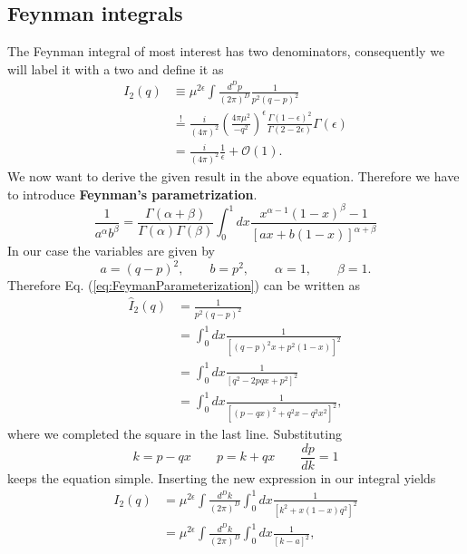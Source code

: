 \subsection*{Feynman integrals}
\label{sec:FeynmanIntegrals}
The Feynman integral of most interest has two denominators, consequently we will label it with a two and define it as
	\begin{equation}
		\label{eq:I2Integral}
		\begin{split}
			I_2(q) &\equiv \mu^{2\epsilon} \int \frac{d^Dp}{(2\pi)^D} \frac{1}{p^2(q-p)^2} \\
			&\overset{!}{=} \frac{i}{(4\pi)^2} \left(\frac{4 \pi \mu^2}{-q^2}\right)^\epsilon \frac{\Gamma(1-\epsilon)^2}{\Gamma(2-2\epsilon)} \Gamma(\epsilon) \\
			&= \frac{i}{(4\pi)^2} \frac{1}{\epsilon} + \mathcal{O}(1).
		\end{split}
	\end{equation}
	We now want to derive the given result in the above equation. Therefore we have to introduce \textbf{Feynman's parametrization}.	
	\begin{equation}
		\label{eq:FeymanParameterization}
		\frac{1}{a^\alpha b^\beta} = \frac{\Gamma(\alpha+\beta)}{\Gamma(\alpha)\Gamma(\beta)} \int_0^1 dx \frac{x^{\alpha-1}(1-x)^\beta-1}{[ax + b(1-x)]^{\alpha+\beta}}
	\end{equation}
	In our case the variables are given by
	\begin{equation}
		a = (q-p)^2, \qquad b = p^2, \qquad \alpha = 1, \qquad \beta = 1.
	\end{equation}
	Therefore Eq. (\ref{eq:FeymanParameterization}) can be written as 
	\begin{equation}
		\begin{split}
			\hat I_2(q) &= \frac{1}{p^2(q-p)^2} \\
			&= \int_0^1 dx \frac{1}{[(q-p)^2x + p^2(1-x)]^2} \\
			&= \int_0^1 dx \frac{1}{[q^2-2pqx+p^2]^2} \\
			&= \int_0^1 dx \frac{1}{[(p-qx)^2 + q^2x - q^2x^2]^2},
		\end{split}
	\end{equation}
	where we completed the square in the last line.
	Substituting
	\begin{equation}
		k = p-qx \qquad p=k+qx \qquad \frac{dp}{dk} = 1
	\end{equation}
 	keeps the equation simple. Inserting the new expression in our integral yields
	\begin{equation}
		\begin{split}
			I_2(q) &= \mu^{2\epsilon} \int \frac{d^Dk}{(2\pi)^D} \int_0^1 dx \frac{1}{[k^2 + x(1-x)q^2]^2} \\
			&= \mu^{2\epsilon} \int \frac{d^Dk}{(2\pi)^D} \int_0^1 dx \frac{1}{[k-a]^2},
		\end{split}
	\end{equation}  	

